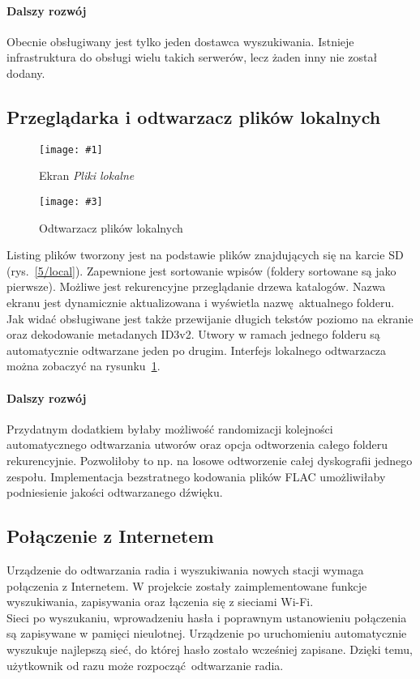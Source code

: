 \documentclass[polish]{aghengthesis}
\newcommand{\imgintss}[5]{
	\begin{figure}[{#5}]
		\centering
		\begin{minipage}{.45\textwidth}
			\centering
			\texttt{[image: \#1]}
			\caption{#2}
			\label{#1}
		\end{minipage}%
		\hfill
		\begin{minipage}{.45\textwidth}
			\centering
			\texttt{[image: \#3]}
			\caption{#4}
			\label{#3}
		\end{minipage}
	\end{figure}
}
\newcommand{\imghss}[4]{\imgintss{#1}{#2}{#3}{#4}{H}}
\begin{document}
			\paragraph{Dalszy rozwój}
				Obecnie obsługiwany jest tylko jeden dostawca wyszukiwania. Istnieje infrastruktura do obsługi wielu takich serwerów, lecz żaden inny nie został dodany.
			
		\subsection{Przeglądarka i odtwarzacz plików lokalnych}
			\imghss{5/local}{Ekran \textit{Pliki lokalne}}{5/local_play}{Odtwarzacz plików lokalnych}
			Listing plików tworzony jest na podstawie plików znajdujących się na karcie SD (rys.~\ref{5/local}). Zapewnione jest sortowanie wpisów (foldery sortowane są jako pierwsze). Możliwe jest rekurencyjne przeglądanie drzewa katalogów. Nazwa ekranu jest dynamicznie aktualizowana i wyświetla nazwę aktualnego folderu. Jak widać obsługiwane jest także przewijanie długich tekstów poziomo na ekranie oraz dekodowanie metadanych ID3v2. Utwory w ramach jednego folderu są automatycznie odtwarzane jeden po drugim. Interfejs lokalnego odtwarzacza można zobaczyć na rysunku~\ref{5/local_play}.
			
			\paragraph{Dalszy rozwój}
				Przydatnym dodatkiem byłaby możliwość randomizacji kolejności automatycznego odtwarzania utworów oraz opcja odtworzenia całego folderu rekurencyjnie. Pozwoliłoby to np. na losowe odtworzenie całej dyskografii jednego zespołu. Implementacja bezstratnego kodowania plików FLAC umożliwiłaby podniesienie jakości odtwarzanego dźwięku.
		
		\subsection{Połączenie z Internetem}
			Urządzenie do odtwarzania radia i wyszukiwania nowych stacji wymaga połączenia z Internetem. W projekcie zostały zaimplementowane funkcje wyszukiwania, zapisywania oraz łączenia się z sieciami Wi-Fi.
			$ $\\
			
			Sieci po wyszukaniu, wprowadzeniu hasła i poprawnym ustanowieniu połączenia są zapisywane w pamięci nieulotnej. Urządzenie po uruchomieniu automatycznie wyszukuje najlepszą sieć, do której hasło zostało wcześniej zapisane. Dzięki temu, użytkownik od razu może rozpocząć odtwarzanie radia.
	
\end{document}

